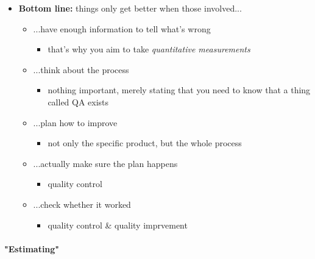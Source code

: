 \documentclass[a4paper]{article}
\providecommand{\tightlist}{%
  \setlength{\itemsep}{0pt}\setlength{\parskip}{0pt}}
\let\oldparagraph\paragraph
\renewcommand{\paragraph}[1]{\oldparagraph{#1}\mbox{}}
\begin{document}
\begin{itemize}
\tightlist
\item
  \textbf{Bottom line:} things only get better when those involved...

  \begin{itemize}
  \tightlist
  \item
    ...have enough information to tell what's wrong

    \begin{itemize}
    \tightlist
    \item
      that's why you aim to take \emph{quantitative measurements}
    \end{itemize}
  \item
    ...think about the process

    \begin{itemize}
    \tightlist
    \item
      nothing important, merely stating that you need to know that a
      thing called QA exists
    \end{itemize}
  \item
    ...plan how to improve

    \begin{itemize}
    \tightlist
    \item
      not only the specific product, but the whole process
    \end{itemize}
  \item
    ...actually make sure the plan happens

    \begin{itemize}
    \tightlist
    \item
      quality control
    \end{itemize}
  \item
    ...check whether it worked

    \begin{itemize}
    \tightlist
    \item
      quality control \& quality imprvement
    \end{itemize}
  \end{itemize}
\end{itemize}

\hypertarget{estimating}{%
\paragraph{"Estimating"}\label{estimating}}
\end{document}
